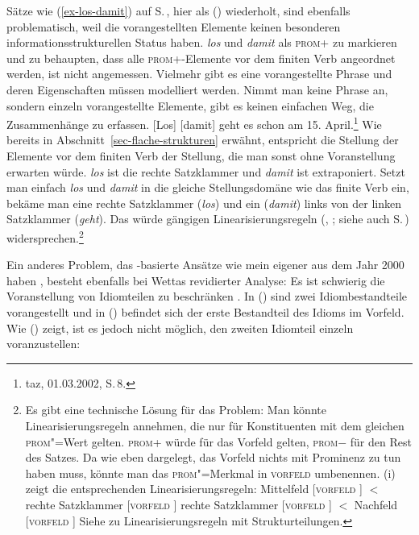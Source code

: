 \begin{exe}
\begin{xlist}
Sätze wie (\ref{ex-los-damit}) auf S.\,\pageref{ex-los-damit}, hier als () wiederholt, sind
ebenfalls problematisch, weil die vorangestellten Elemente keinen besonderen
informationsstrukturellen Status haben. \emph{los} und \emph{damit} als \textsc{prom}+ zu markieren
und zu behaupten, dass alle \textsc{prom}+-Elemente vor dem finiten Verb angeordnet werden, ist
nicht angemessen. Vielmehr gibt es eine vorangestellte Phrase und deren Eigenschaften müssen
modelliert werden. Nimmt man keine Phrase an, sondern einzeln vorangestellte Elemente, gibt es
keinen einfachen Weg, die Zusammenhänge zu erfassen.
\ea
\label{ex-los-damit-zwei} 
[Los] [damit] geht es schon am 15. April.\footnote{
        taz, 01.03.2002, S.\,8.
    }
\z
Wie bereits in Abschnitt~\ref{sec-flache-strukturen} erwähnt, entspricht die Stellung der Elemente
vor dem finiten Verb der Stellung, die man sonst ohne Voranstellung erwarten würde. \emph{los} ist
die rechte Satzklammer und \emph{damit} ist extraponiert. Setzt man einfach \emph{los} und
\emph{damit} in die gleiche Stellungsdomäne wie das finite Verb ein, bekäme man eine rechte
Satzklammer (\emph{los}) und ein \nf (\emph{damit}) links von der linken Satzklammer (\emph{geht}).
Das würde gängigen Linearisierungsregeln (\zB, \citealt[50]{Kathol2001a}; siehe auch S.\,\pageref{page-Kathol-1-2-3-4}) widersprechen.\footnote{
  Es gibt eine technische Lösung für das Problem: Man könnte Linearisierungsregeln annehmen, die nur
  für Konstituenten mit dem gleichen \textsc{prom}"=Wert gelten. \textsc{prom}+ würde für das
  Vorfeld gelten, \textsc{prom}$-$ für den Rest des Satzes. Da wie eben dargelegt, das Vorfeld
  nichts mit Prominenz zu tun haben muss, könnte man das \textsc{prom}"=Merkmal in \textsc{vorfeld}
  umbenennen. (i) zeigt die entsprechenden Linearisierungsregeln: 
\eal
\ex Mittelfeld [\textsc{vorfeld}  ] $<$ rechte Satzklammer [\textsc{vorfeld}  ]
\ex rechte Satzklammer [\textsc{vorfeld}  ] $<$ Nachfeld [\textsc{vorfeld}  ]
\zl         
Siehe  zu Linearisierungsregeln mit Strukturteilungen.
}

Ein\label{page-MVF-Idiome} anderes Problem, das \slasch-basierte Ansätze wie mein eigener aus dem Jahr 2000 haben
\citep[Abschnitt~2.8.3.2]{Mueller2000d}, besteht ebenfalls bei Wettas revidierter Analyse: Es ist
schwierig die Voranstellung von Idiomteilen zu beschränken \citep[307]{Mueller2005d}. In
() sind zwei Idiombestandteile vorangestellt und in () befindet sich der erste Bestandteil des
Idioms im Vorfeld. Wie () zeigt, ist es jedoch nicht
möglich, den zweiten Idiomteil einzeln voranzustellen:


\end{xlist}
\end{exe}
